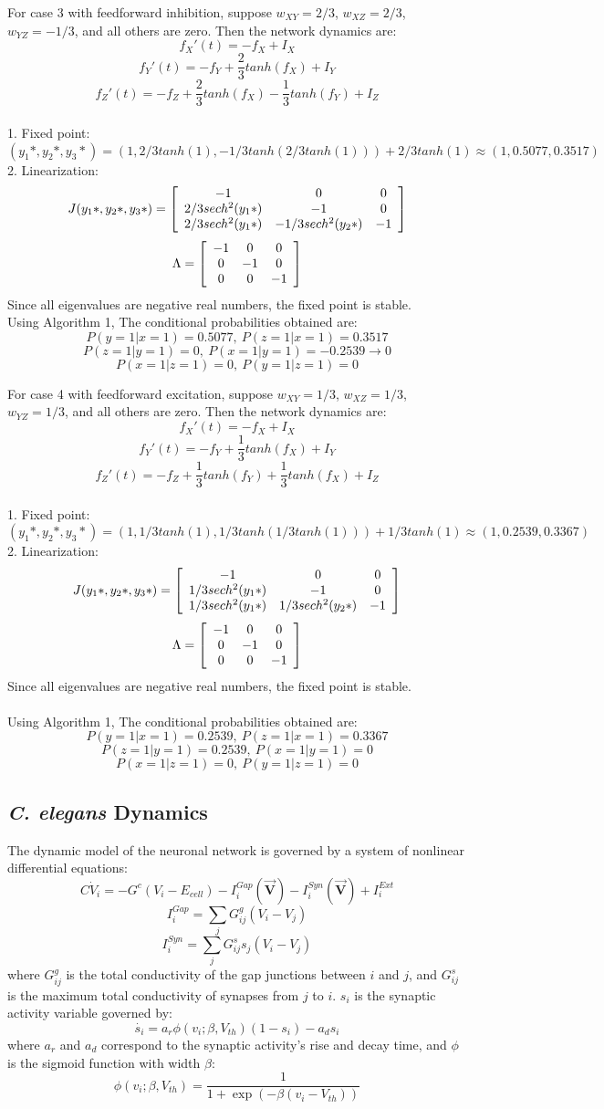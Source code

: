 \documentclass[letterpaper,11pt]{article}
\newcommand\tab[1][6mm]{\hspace*{#1}}
\newenvironment{mat}{\left[\begin{array}{ccccccccccccccc}}{\end{array}\right]}
\newcommand\bcm{\begin{mat}}
\newcommand\ecm{\end{mat}}
\begin{document}
For case 3 with feedforward inhibition, suppose $w_{XY}=2/3$, $w_{XZ}=2/3$, $w_{YZ}=-1/3$, and all others are zero. Then the network dynamics are:\\
\[f_X'(t)=-f_X+I_X \]
\[f_Y'(t)=-f_Y+\frac{2}{3}tanh(f_X)+I_Y\]
\[f_Z'(t)=-f_Z+\frac{2}{3}tanh(f_X)-\frac{1}{3}tanh(f_Y)+I_Z\]
\\
1. Fixed point: \[(y_1*,y_2*,y_3*)=(1, 2/3tanh(1), -1/3tanh(2/3tanh(1)))+2/3tanh(1)\approx (1, 0.5077, 0.3517)\]
2. Linearization: \[J(y_1*,y_2*,y_3*)=\bcm -1&0&0\\2/3sech^2(y_1*)&-1&0\\2/3sech^2(y_1*)& -1/3sech^2(y_2*)&-1\ecm\]
\[\Lambda=\bcm -1&0&0\\0&-1&0\\0&0&-1\ecm\]
Since all eigenvalues are negative real numbers, the fixed point is stable.\\
Using Algorithm 1, The conditional probabilities obtained are:
\[P(y=1|x=1)=0.5077, \ P(z=1|x=1)=0.3517\]
\[P(z=1|y=1)=0, \ P(x=1|y=1)=-0.2539 \rightarrow 0\]
\[P(x=1|z=1)=0, \ P(y=1|z=1)=0\]

For case 4 with feedforward excitation, suppose $w_{XY}=1/3$, $w_{XZ}=1/3$, $w_{YZ}=1/3$, and all others are zero. Then the network dynamics are:\\
\[f_X'(t)=-f_X+I_X \]
\[f_Y'(t)=-f_Y+\frac{1}{3}tanh(f_X)+I_Y\]
\[f_Z'(t)=-f_Z+\frac{1}{3}tanh(f_Y)+\frac{1}{3}tanh(f_X)+I_Z\]
\\
1. Fixed point: \[(y_1*,y_2*,y_3*)=(1, 1/3tanh(1), 1/3tanh(1/3tanh(1)))+1/3tanh(1)\approx (1, 0.2539, 0.3367)\]
2. Linearization: \[J(y_1*,y_2*,y_3*)=\bcm -1&0&0\\1/3sech^2(y_1*)&-1&0\\1/3sech^2(y_1*)& 1/3sech^2(y_2*)&-1\ecm\] 
\[\Lambda=\bcm -1&0&0\\0&-1&0\\0&0&-1\ecm\]
Since all eigenvalues are negative real numbers, the fixed point is stable.\\
\\
Using Algorithm 1, The conditional probabilities obtained are:\\
\[P(y=1|x=1)=0.2539, \ P(z=1|x=1)=0.3367\]
\[P(z=1|y=1)=0.2539, \ P(x=1|y=1)=0\]
\[P(x=1|z=1)=0, \ P(y=1|z=1)=0\]

\subsection{\textit{C. elegans} Dynamics}
\tab The dynamic model of the neuronal network is governed by a system of nonlinear differential equations:
\[C\dot{V}_i=-G^c(V_i-E_{cell})-I_i^{Gap}(\overrightarrow{\textbf{V}})-I_i^{Syn}(\overrightarrow{\textbf{V}})+I_i^{Ext}\]
\[I_i^{Gap}=\sum_j G_{ij}^g(V_i-V_j)\]
\[I_i^{Syn}=\sum_j G_{ij}^ss_j(V_i-V_j)\]
where $G_{ij}^g$ is the total conductivity of the gap junctions between $i$ and $j$, and $G_{ij}^s$ is the maximum total conductivity of synapses from $j$ to $i$. $s_i$ is the synaptic activity variable governed by:
\[\dot{s_i}=a_r\phi(v_i; \beta, V_{th})(1-s_i)-a_d s_i\]
where $a_r$ and $a_d$ correspond to the synaptic activity's rise and decay time, and $\phi$ is the sigmoid function with width $\beta$:
\[\phi(v_i; \beta, V_{th})=\frac{1}{1+\exp(-\beta (v_i-V_{th}))}\]
\end{document}
